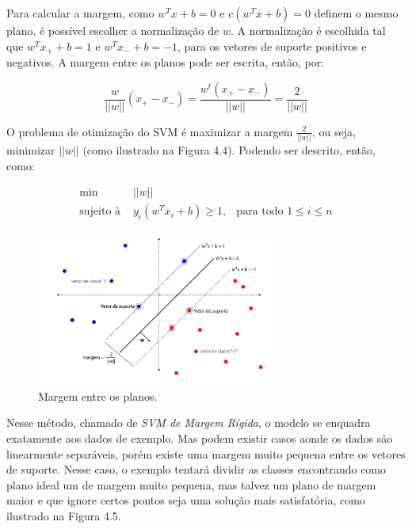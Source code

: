 Para calcular a margem, como ${w}^{T}x + b = 0$ e $c({w}^{T}x + b) = 0$ definem o mesmo plano, é possível escolher a normalização de $w$. A normalização é escolhida tal que ${w}^{T}{x}_{+} + b = 1$ e ${w}^{T}{x}_{-} + b = -1$, para os vetores de suporte positivos e negativos. A margem entre os planos pode ser escrita, então, por:

\begin{equation*}
	\frac{w}{||w||}({x}_{+} - {x}_{-}) = \frac{{w}^{t}({x}_{+} - {x}_{-})}{||w||} = \frac{2}{||w||}
\end{equation*}

O problema de otimização do SVM é maximizar a margem $\frac{2}{||w||}$, ou seja, minimizar $||w||$ (como ilustrado na Figura 4.4). Podendo ser descrito, então, como:

\begin{equation*}
\begin{matrix}
\min & ||w|| & \\ 
\text{sujeito à } & {y}_{i}({w}^{T}{x}_{i} + b) \geq 1, & \text{para todo } 1 \leq i \leq n
\end{matrix}
\end{equation*}

\begin{figure}[htpb]
	\begin{center}
		\includegraphics[width=0.7\textwidth]{figuras/svm-regions-2.pdf}
		\caption{Margem entre os planos.}
	\end{center}
\end{figure}

Nesse método, chamado de \textit{SVM de Margem Rígida}, o modelo se enquadra exatamente aos dados de exemplo. Mas podem existir casos aonde os dados são linearmente separáveis, porém existe uma margem muito pequena entre os vetores de suporte. Nesse caso, o exemplo tentará dividir as classes encontrando como plano ideal um de margem muito pequena, mas talvez um plano de margem maior e que ignore certos pontos seja uma solução mais satisfatória, como ilustrado na Figura 4.5.

